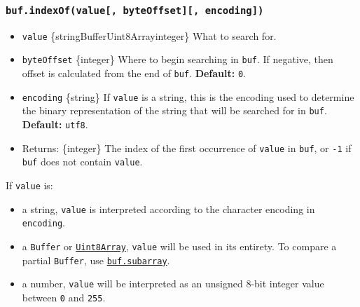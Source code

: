 \subsubsection{\texorpdfstring{\texttt{buf.indexOf(value{[},\ byteOffset{]}{[},\ encoding{]})}}{buf.indexOf(value{[}, byteOffset{]}{[}, encoding{]})}}\label{buf.indexofvalue-byteoffset-encoding}

\begin{itemize}
\tightlist
\item
  \texttt{value}
  \{string\textbar Buffer\textbar Uint8Array\textbar integer\} What to
  search for.
\item
  \texttt{byteOffset} \{integer\} Where to begin searching in
  \texttt{buf}. If negative, then offset is calculated from the end of
  \texttt{buf}. \textbf{Default:} \texttt{0}.
\item
  \texttt{encoding} \{string\} If \texttt{value} is a string, this is
  the encoding used to determine the binary representation of the string
  that will be searched for in \texttt{buf}. \textbf{Default:}
  \texttt{\textquotesingle{}utf8\textquotesingle{}}.
\item
  Returns: \{integer\} The index of the first occurrence of
  \texttt{value} in \texttt{buf}, or \texttt{-1} if \texttt{buf} does
  not contain \texttt{value}.
\end{itemize}

If \texttt{value} is:

\begin{itemize}
\tightlist
\item
  a string, \texttt{value} is interpreted according to the character
  encoding in \texttt{encoding}.
\item
  a \texttt{Buffer} or
  \href{https://developer.mozilla.org/en-US/docs/Web/JavaScript/Reference/Global_Objects/Uint8Array}{\texttt{Uint8Array}},
  \texttt{value} will be used in its entirety. To compare a partial
  \texttt{Buffer}, use
  \hyperref[bufsubarraystart-end]{\texttt{buf.subarray}}.
\item
  a number, \texttt{value} will be interpreted as an unsigned 8-bit
  integer value between \texttt{0} and \texttt{255}.
\end{itemize}

